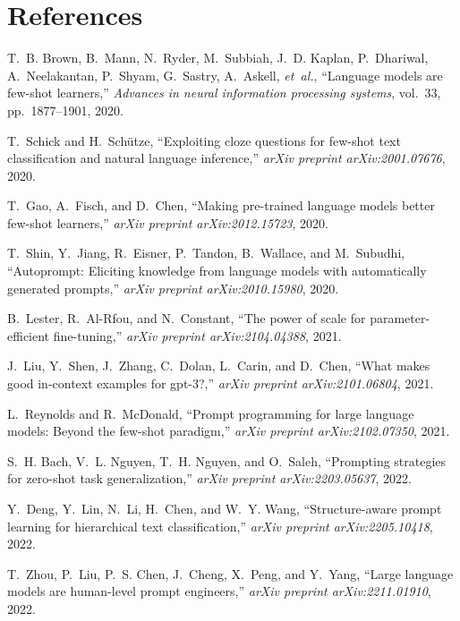 \documentclass{article}
\begin{document}



\section*{References}

\begin{thebibliography}{10}

T.~B. Brown, B.~Mann, N.~Ryder, M.~Subbiah, J.~D. Kaplan, P.~Dhariwal,
  A.~Neelakantan, P.~Shyam, G.~Sastry, A.~Askell, {\em et~al.}, ``Language
  models are few-shot learners,'' {\em Advances in neural information
  processing systems}, vol.~33, pp.~1877--1901, 2020.

T.~Schick and H.~Sch{\"u}tze, ``Exploiting cloze questions for few-shot text
  classification and natural language inference,'' {\em arXiv preprint
  arXiv:2001.07676}, 2020.

T.~Gao, A.~Fisch, and D.~Chen, ``Making pre-trained language models better
  few-shot learners,'' {\em arXiv preprint arXiv:2012.15723}, 2020.

T.~Shin, Y.~Jiang, R.~Eisner, P.~Tandon, B.~Wallace, and M.~Subudhi,
  ``Autoprompt: Eliciting knowledge from language models with automatically
  generated prompts,'' {\em arXiv preprint arXiv:2010.15980}, 2020.

B.~Lester, R.~Al-Rfou, and N.~Constant, ``The power of scale for parameter-efficient
  fine-tuning,'' {\em arXiv preprint arXiv:2104.04388}, 2021.

J.~Liu, Y.~Shen, J.~Zhang, C.~Dolan, L.~Carin, and D.~Chen, ``What makes good
  in-context examples for gpt-3?,'' {\em arXiv preprint arXiv:2101.06804},
  2021.

L.~Reynolds and R.~McDonald, ``Prompt programming for large language models:
  Beyond the few-shot paradigm,'' {\em arXiv preprint arXiv:2102.07350},
  2021.

S.~H. Bach, V.~L. Nguyen, T.~H. Nguyen, and O.~Saleh, ``Prompting strategies
  for zero-shot task generalization,'' {\em arXiv preprint arXiv:2203.05637},
  2022.

Y.~Deng, Y.~Lin, N.~Li, H.~Chen, and W.~Y. Wang, ``Structure-aware prompt
  learning for hierarchical text classification,'' {\em arXiv preprint
  arXiv:2205.10418}, 2022.

T.~Zhou, P.~Liu, P.~S. Chen, J.~Cheng, X.~Peng, and Y.~Yang, ``Large language
  models are human-level prompt engineers,'' {\em arXiv preprint
  arXiv:2211.01910}, 2022.

\end{thebibliography}
\end{document}
